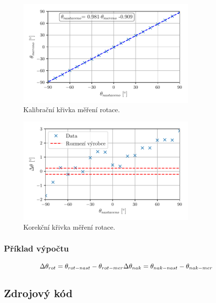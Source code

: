 \documentclass{protokol}
\begin{document}
    \begin{figure}[h!]
        \centering
        \includegraphics[width=0.8\textwidth]{img/rotace-kalib.pdf}
        \caption{Kalibrační křivka měření rotace.}
        \label{fig:img/graf-2}
    \end{figure}

    \begin{figure}[h!]
        \centering
        \includegraphics[width=0.8\textwidth]{img/rotace-korek.pdf}
        \caption{Korekční křivka měření rotace.}
        \label{fig:img/graf-2}
    \end{figure}

    \subsubsection{Příklad výpočtu}
    
    \[
        \Delta \theta_{rot} = \theta_{rot-nast} - \theta_{rot-mer} \\
        \Delta \theta_{nak} = \theta_{nak-nast} - \theta_{nak-mer} 
    \]

    \clearpage
    \subsection{Zdrojový kód}
    
\end{document}
